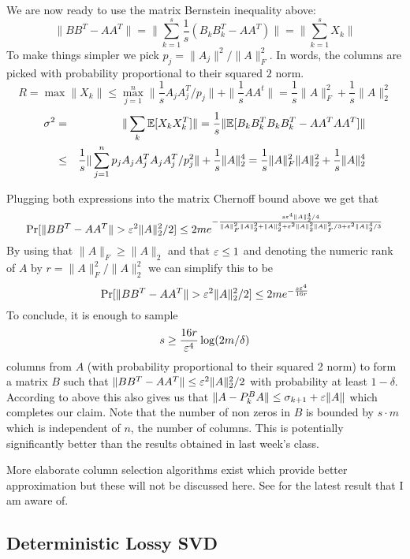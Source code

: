 We are now ready to use the matrix Bernstein inequality above: 
\[
\|BB^T - AA^T\| = \|\sum_{k=1}^{s}  \frac{1}{s}(B_kB_k^T - AA^T)\| = \|\sum_{k=1}^{s}  X_k\|
\]
To make things simpler we pick $p_j = \|A_j\|^2/\|A\|_F^2$. In words, the columns are picked with probability proportional to their squared $2$ norm.
\[
R = \max \|X_k\| \le \max_{j=1}^{n} \|  \frac{1}{s}A_jA_j^T/p_j\| +  \|\frac{1}{s}AA^t\| = \frac{1}{s}\|A\|_F^2 + \frac{1}{s}\|A\|_2^2
\]
\begin{eqnarray}
\sigma^2 &=& \|\sum_k {\mathbb E}[X_k X_k^T]\| = \frac{1}{s}\|{\mathbb E}[B_k B_k^TB_k B_k^T - AA^TAA^T]\| \\
&\le& \frac{1}{s}\|\sum_{j=1}^{n}p_jA_j A_j^TA_j A_j^T/p_j^2\|+ \frac{1}{s}\|A\|_2^4 = \frac{1}{s} \|A\|_F^2\|A\|_2^2 + \frac{1}{s} \|A\|_2^4
\end{eqnarray}

Plugging both expressions into the matrix Chernoff bound above we get that
\[
\Pr[\|BB^T - AA^T\| > \varepsilon^2\|A\|_2^2/2] \le 2me^{-\frac{s\varepsilon^4\|A\|_{2}^{4}/4}{\|A\|_F^2\|A\|_2^2 + \|A\|_2^4 + \varepsilon^2\|A\|_2^2\|A\|_F^2/3 + \varepsilon^2\|A\|_2^4/3}}
\]
By using that $\|A\|_F \ge \|A\|_2$ and that $\varepsilon \le 1$ and denoting the numeric rank of $A$ by $r = \|A\|_F^2/\|A\|_2^2$ we can simplify this to be
\[
\Pr[\|BB^T - AA^T\| > \varepsilon^2\|A\|_2^2/2] \le 2me^{-\frac{s\varepsilon^4}{16r}}
\]
To conclude, it is enough to sample 
\[
s \ge \frac{16r}{\varepsilon^4}\log(2m/\delta)
\] 
columns from $A$ (with probability proportional to their squared 2 norm) to form a matrix $B$ such that $\|BB^T - AA^T\| \le \varepsilon^2\|A\|_2^2/2$ with probability at least $1-\delta$. According to above this also gives us that $\|A - P_k^BA\| \le \sigma_{k+1} + \varepsilon\|A\|$ which completes our claim.
Note that the number of non zeros in $B$ is bounded by $s\cdot m$ which is independent of $n$, the number of columns.
This is potentially significantly better than the results obtained in last week's class.
 
 
\begin{remark}
More elaborate column selection algorithms exist which provide better approximation but these will not be discussed here.
See \cite{Boutsidis2011} for the latest result that I am aware of.
\end{remark}

\subsection*{Deterministic Lossy SVD}

\newcommand{\diag}{\operatorname{diag}}
\newcommand{\tr}{\operatorname{tr}}


